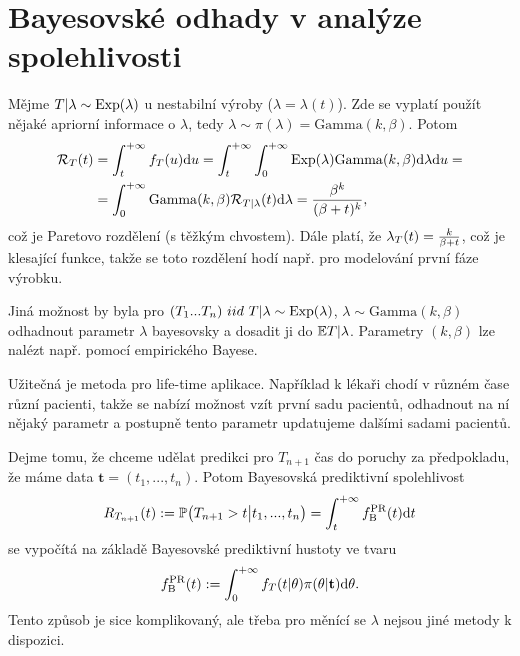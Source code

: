 \section{Bayesovské odhady v analýze spolehlivosti}

\begin{define}
	Mějme $T|\lambda\sim \mathrm{Exp}(\lambda)$ u nestabilní výroby ($\lambda=\lambda(t)$). Zde se vyplatí použít nějaké apriorní informace o $\lambda$, tedy $\lambda\sim\pi(\lambda)=\mathrm{Gamma}(k,\beta)$. Potom
	\begin{align*}
	 \mathcal{R}_T(t)&=\int_{t}^{+\infty}f_T(u)\mathrm{d} 
	 u=\int_{t}^{+\infty}\int_{0}^{+\infty}\mathrm{Exp}(\lambda)
	 \mathrm{Gamma}(k,\beta)\mathrm{d}\lambda\mathrm{d} u 
	 =\\&=\int_{0}^{+\infty}\mathrm{Gamma}(k,\beta)\mathcal{R}_{T|\lambda}(t)\mathrm{d}
	 \lambda=\frac{\beta^k}{(\beta+t)^k}, 
	\end{align*}
	což je Paretovo rozdělení (s těžkým chvostem). Dále platí, že 
	$\lambda_T(t)=\frac{k}{\beta+t}$, což je klesající funkce, takže se toto 
	rozdělení hodí např. pro modelování první fáze výrobku.
\end{define}

\begin{example}
	Jiná možnost by byla pro $(T_1...T_n)~iid~T|\lambda\sim\mathrm{Exp}(\lambda)$, $\lambda\sim\mathrm{Gamma}(k,\beta)$ odhadnout parametr $\lambda$ bayesovsky a dosadit ji do $\mathbb{E} T|\lambda$. Parametry $(k, \beta)$ lze nalézt např. pomocí empirického Bayese.
\end{example}

	Užitečná je metoda pro life-time aplikace. Například k lékaři chodí v různém čase různí pacienti, takže se nabízí možnost vzít první sadu pacientů, odhadnout na ní nějaký parametr a postupně tento parametr updatujeme dalšími sadami pacientů.

Dejme tomu, že chceme udělat predikci pro $T_{n+1}$ čas do poruchy za 
předpokladu, že máme data $\textbf{t}=(t_1,...,t_n)$. Potom Bayesovská 
prediktivní spolehlivost $$R_{T_{n+1}}(t):=\mathbb{P}\big(T_{n+1}>t\big| 
t_1,...,t_n\big)=\int_{t}^{+\infty}f_\mathrm{B}^{\mathrm{PR}}(t)\mathrm{d} t$$ 
se vypočítá na základě Bayesovské prediktivní hustoty ve tvaru 
$$f_\mathrm{B}^{\mathrm{PR}}(t):=\int_{0}^{+\infty}f_T(t|\theta)
\pi(\theta|\textbf{t})\mathrm{d}\theta.$$
 Tento způsob je sice komplikovaný, ale třeba pro měnící se $\lambda$ 
nejsou jiné metody k dispozici.
